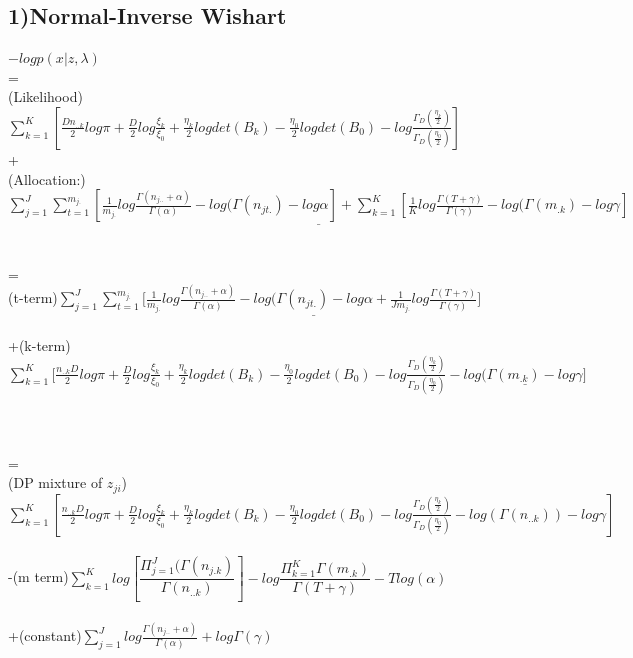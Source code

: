 \documentclass{article}
\begin{document}
\begin{spacing}{1.1}
\section{1)Normal-Inverse Wishart}
$-log p(x|z,\lambda)$\\ =\\
(Likelihood)$ \sum_{k=1}^{K} [\frac{D n_{..k}}{2}log\pi+\frac{D}{2}log\frac{\xi_{k}}{\xi_{0}}+\frac{\eta_{k}}{2}log det(B_{k})-\frac{\eta_{0}}{2}log det(B_{0})
-log \frac{\Gamma_{D}(\frac{\eta_{k}}{2})}{\Gamma_{D}(\frac{\eta_{0}}{2})}]$
\\
+
\\
(Allocation:)$\underline{\sum_{j=1}^{J}\sum_{t=1}^{m_{j.}}[\frac{1}{m_{j.}}log \frac{\Gamma(n_{j..}+\alpha)}{\Gamma(\alpha)} -log(\Gamma(n_{jt.})-log \alpha]+
 \sum_{k=1}^{K} [\frac{1}{K}log \frac{\Gamma(T+\gamma)}{\Gamma(\gamma)} -log(\Gamma(m_{.k})-log \gamma]}$
\\ \\ \\
=\\
(t-term)$ \sum_{j=1}^{J}\sum_{t=1}^{m_{j.}}[\underline{\frac{1}{m_{j.}}log \frac{\Gamma(n_{j..}+\alpha)}{\Gamma(\alpha)} -log(\Gamma(n_{jt.})-log \alpha
+\frac{1}{J m_{j.}}log \frac{\Gamma(T+\gamma)}{\Gamma(\gamma)}]}$\\ \\
+(k-term)$\sum_{k=1}^{K} [\frac{n_{..k}D}{2}log\pi+\frac{D}{2}log\frac{\xi_{k}}{\xi_{0}}+\frac{\eta_{k}}{2}log det(B_{k})-\frac{\eta_{0}}{2}log det(B_{0})
-log \frac{\Gamma_{D}(\frac{\eta_{k}}{2})}{\Gamma_{D}(\frac{\eta_{0}}{2})}
-\underline{log(\Gamma(m_{.k})-log \gamma]}$\\ \\ \\ \\
=\\
(DP mixture of $z_{ji}$)$\sum_{k=1}^{K} [\frac{n_{..k}D}{2}log\pi+\frac{D}{2}log\frac{\xi_{k}}{\xi_{0}}+\frac{\eta_{k}}{2}log det(B_{k})-\frac{\eta_{0}}{2}log det(B_{0})
-log \frac{\Gamma_{D}(\frac{\eta_{k}}{2})}{\Gamma_{D}(\frac{\eta_{0}}{2})}
-log(\Gamma(n_{..k}))-log \gamma]$\\ \\
-(m term)$\sum_{k=1}^{K} log [\dfrac{\Pi_{j=1}^{J}(\Gamma(n_{j.k})}{\Gamma(n_{..k})}]-log\dfrac{\Pi_{k=1}^{K}\Gamma(m_{.k})}{\Gamma(T+\gamma)}-Tlog(\alpha)$\\ \\
+(constant)$\sum_{j=1}^{J}log \frac{\Gamma(n_{j..}+\alpha)}{\Gamma(\alpha)}+log \Gamma(\gamma)$



\end{spacing}
\end{document}
